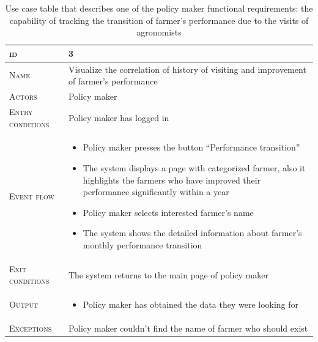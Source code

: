 \begin{table}[H]
    \centering
    \begin{tabular}{|l|p{}|}
        \hline %
    	\textsc{id}                 &   3\\
    	\hline %
    	\textsc{Name}               &   Visualize the correlation of history of visiting and improvement of farmer's performance\\
    	\hline %
    	\textsc{Actors}             &   Policy maker\\
    	\hline %
    	\textsc{Entry conditions}   &   Policy maker has logged in\\
    	\hline %
    	\textsc{Event flow}         &   %
            	                        \begin{itemize}
                                    	    \item Policy maker presses the button “Performance transition”
                                    		\item The system displays a page with categorized farmer, also it highlights the farmers who have improved their performance significantly within a year
                                    		\item Policy maker selects interested farmer’s name
                                    		\item The system shows the detailed information about farmer’s monthly performance transition 
                                        \end{itemize}\\
        \hline %
        \textsc{Exit conditions}    &  The system returns to the main page of policy maker\\
    	\hline %
    	\textsc{Output}             &  \begin{itemize}
    	    \item Policy maker has obtained the data they were looking for
    	\end{itemize}\\
    	\hline %
    	\textsc{Exceptions}         &  Policy maker couldn’t find the name of farmer who should exist\\
    	\hline %
        
    \end{tabular}
    \caption{\label{tab:visualize_iprovement}Use case table that describes one of the policy maker functional requirements:  the capability of tracking the transition of farmer's performance due to the visits of agronomists} %
\end{table}

